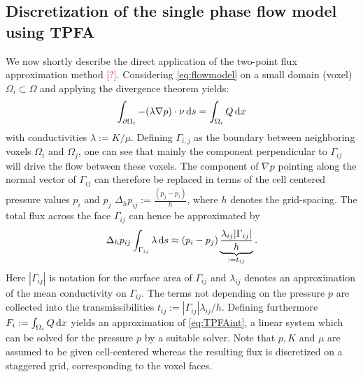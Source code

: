 \documentclass[paper=a4, fontsize=12pt,parskip=half,headings=small]{scrartcl}
\newcommand{\missingsource}{\textcolor{red}{[?]}}
\begin{document}
	\subsection{Discretization of the single phase flow model using TPFA} \label{sec:numflow}

	We now shortly describe the direct application of the two-point flux approximation method \missingsource.
	Considering \eqref{eq:flowmodel} on a small domain (voxel) $\Omega_i \subset \Omega$ and applying the divergence theorem yields:
	\begin{equation}
		\int_{\partial \Omega_i}   -(\lambda \nabla p) \cdot \nu \,\mathrm{d} s = \int_{\Omega_i}Q \,\mathrm{d} x
	\label{eq:TPFAint}
	\end{equation}
	with conductivities $\lambda := K/\mu$.
	Defining $\Gamma_{i,j}$ as the boundary between neighboring voxels $\Omega_i$ and $\Omega_j$, one can see that mainly the component perpendicular to $\Gamma_{ij}$ will drive the flow between these voxels.
	The component of $\nabla p$ pointing along the normal vector of $\Gamma_{ij}$ can therefore be replaced in terms of the cell centered pressure values $p_i$ and $p_j$
 	$\Delta_h p_{ij} := \frac{(p_j - p_i)}{h}$, where $h$ denotes the grid-spacing.
	The total flux across the face $\Gamma_{ij}$ can hence be approximated by
	\[
		\Delta_h p_{ij} \int_{\Gamma_{ij}}\lambda \,\mathrm{d} s \approx (p_i - p_j) \underbrace{\frac{\lambda_{ij} \vert \Gamma_{ij} \vert}{h}}_{:=t_{ij}}.
	\]
	Here $|\Gamma_{ij}|$ is notation for the surface area of $\Gamma_{ij}$ and $\lambda_{ij}$ denotes an approximation of the mean conductivity on $\Gamma_{ij}$.
	The terms not depending on the pressure $p$ are collected into the transmissibilities $t_{ij}:=|\Gamma_{ij}|\lambda_{ij}/h$.
	Defining furthermore $F_i:=\int_{\Omega_i}Q\,\mathrm{d} x$ yields an approximation of \eqref{eq:TPFAint}, a linear system which can be solved for the pressure $p$ by a suitable solver.
	Note that $p,K$ and $\mu$ are assumed to be given cell-centered whereas the resulting flux is discretized on a staggered grid, corresponding to the voxel faces.


\end{document}
